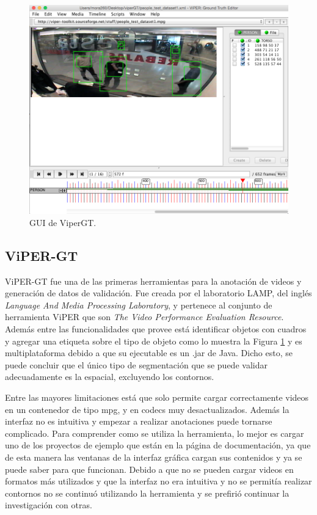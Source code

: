 \begin{figure}
	\includegraphics[width=0.95\linewidth]{images/viper}
	\caption{GUI de ViperGT.} \label{fig:viperGUI}
\end{figure}


\subsection{ViPER-GT}

ViPER-GT fue una de las primeras herramientas para la anotación de videos y generación de datos de validación. Fue creada por el laboratorio LAMP, del inglés \emph{Language And Media Processing Laboratory}, y pertenece al conjunto de herramienta ViPER que son \emph{The Video Performance Evaluation Resource}. Además entre las funcionalidades que provee está identificar objetos con cuadros y agregar una etiqueta sobre el tipo de objeto como lo muestra la Figura \ref{fig:viperGUI} y es multiplataforma debido a que su ejecutable es un .jar de Java. Dicho esto, se puede concluir que el único tipo de segmentación que se puede validar adecuadamente es la espacial, excluyendo los contornos.

Entre las mayores limitaciones está que solo permite cargar correctamente videos en un contenedor de tipo mpg, y en codecs muy desactualizados. Además la interfaz no es intuitiva y empezar a realizar anotaciones puede tornarse complicado. Para comprender como se utiliza la herramienta, lo mejor es cargar uno de los proyectos de ejemplo que están en la página de documentación, ya que de esta manera las ventanas de la interfaz gráfica cargan sus contenidos y ya se puede saber para que funcionan. Debido a que no se pueden cargar videos en formatos más utilizados y que la interfaz no era intuitiva y no se permitía realizar contornos no se continuó utilizando la herramienta y se prefirió continuar la investigación con otras.

